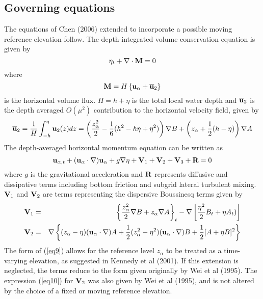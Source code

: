 \documentclass[11pt]{article}
\newcommand{\be}{\begin{equation}}
\newcommand{\ee}{\end{equation}}
\newcommand{\ba}{\begin{eqnarray}}
\newcommand{\ea}{\end{eqnarray}}
\begin{document}
\subsection{Governing equations}

The equations of Chen (2006) extended to incorporate a possible moving reference elevation follow.  The depth-integrated volume conservation equation is given by
\be
\eta_t  +  \nabla \cdot {\bf M} =0  \label{eq5}
\ee
where 
\be
{\bf M}  =  H  \left\{ {\bf u}_\alpha +  \overline{\bf u}_2  \right\}  \label{eq6}
\ee
is the horizontal volume flux.  $H = h + \eta $ is the total local water depth  and $\overline{\bf u}_2$ is the depth averaged $O(\mu^2)$ contribution to the horizontal velocity field, given by
\be
\overline{\bf u}_2 = \frac{1}{H} \int_{-h}^\eta {\bf u}_2(z) dz =  \left(\frac{z_\alpha^2}{2} -\frac{1}{6} (h^2 - h\eta +\eta^2) \right) \nabla B  +  \left( z_\alpha +\frac{1}{2} (h - \eta )\right) \nabla A   \label{eq7}
\ee
The depth-averaged horizontal momentum equation can be written as
\be
 {\bf u}_{\alpha,t} + ({\bf u}_\alpha \cdot \nabla) {\bf u}_\alpha + g \nabla \eta + {\bf V}_{1} +{\bf V}_2+{\bf V}_3 + {\bf R}  = 0  \label{eq8}
\ee
where $g$ is the gravitational acceleration and $ {\bf R}$ represents diffusive and dissipative terms including bottom friction and subgrid lateral turbulent mixing. ${\bf V}_1$ and ${\bf V}_2$  are terms representing the dispersive Boussinesq terms given by 
\ba
{\bf V}_1 &=&  \left\{ \frac{z_\alpha^2}{2} \nabla B + z_{\alpha} \nabla A \right\}_t   - \nabla \left[ \frac{\eta^2}{2} B_{ t } + \eta A_{ t }) \right]   \label{eq9} \\
{\bf V}_2  &= &  \nabla \left \{ (z_\alpha - \eta) ({\bf u}_\alpha \cdot \nabla) A + \frac{1}{2} (z_\alpha^2 - \eta^2) ({\bf u}_\alpha \cdot \nabla) B
 + \frac{1}{2}  [A + \eta B]^2 \right\}   \label{eq10}
\ea
The form of (\ref{eq9}) allows for the reference level $z_\alpha$ to be treated as a time-varying elevation, as suggested in Kennedy et al (2001).  If this extension is neglected, the terms reduce to the form given originally by Wei et al (1995).   The expression (\ref{eq10})  for ${\bf V}_2$ was also given by Wei et al (1995), and is not altered by the choice of a fixed or moving reference elevation.
\end{document}
